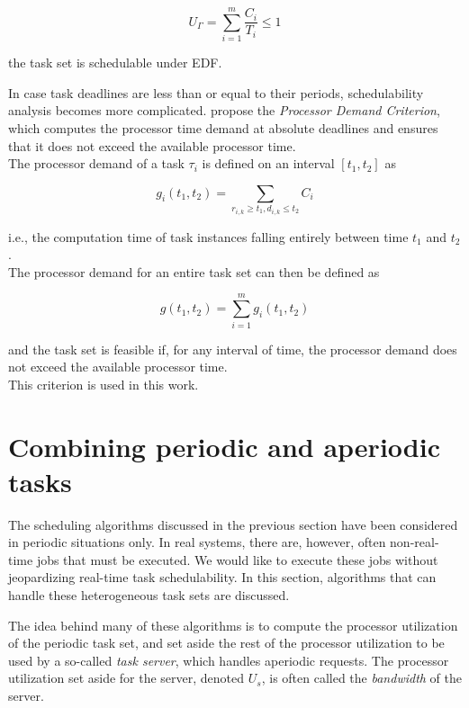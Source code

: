 \begin{equation}
    U_\Gamma = \sum_{i=1}^m \dfrac{C_i}{T_i} \le 1
\end{equation}

\noindent the task set is schedulable under EDF.

In case task deadlines are less than or equal to their periods, schedulability analysis becomes more complicated. \textcite{Baruah1990} propose the \emph{Processor Demand Criterion}, which computes the processor time demand at absolute deadlines and ensures that it does not exceed the available processor time.\\

\noindent The processor demand of a task $\tau_i$ is defined on an interval $[t_1, t_2]$ as

\begin{equation}
    g_i(t_1, t_2) = \sum_{r_{i,k} \ge t_1, d_{i,k} \le t_2} C_i
\end{equation}


\noindent i.e., the computation time of task instances falling entirely between time $t_1$ and $t_2$.\\

\noindent The processor demand for an entire task set can then be defined as

\begin{equation}
    g(t_1, t_2) = \sum_{i=1}^m g_i(t_1, t_2)
\end{equation}

\noindent and the task set is feasible if, for any interval of time, the processor demand does not exceed the available processor time.\\

\noindent This criterion is used in this work.

\section{Combining periodic and aperiodic tasks}
The scheduling algorithms discussed in the previous section have been considered in periodic situations only. In real systems, there are, however, often non-real-time jobs that must be executed. We would like to execute these jobs without jeopardizing real-time task schedulability. In this section, algorithms that can handle these heterogeneous task sets are discussed.

The idea behind many of these algorithms is to compute the processor utilization of the periodic task set, and set aside the rest of the processor utilization to be used by a so-called \emph{task server}, which handles aperiodic requests. The processor utilization set aside for the server, denoted $U_s$, is often called the \emph{bandwidth} of the server.

